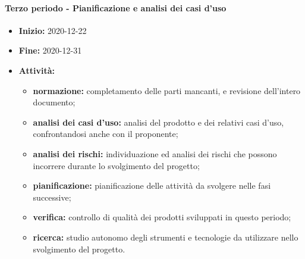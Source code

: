 \paragraph[Terzo periodo]{Terzo periodo - \textnormal{Pianificazione e analisi dei casi d'uso}}
\begin{itemize}
    \item [] \textbf{Inizio:} 2020-12-22
    \item [] \textbf{Fine:} 2020-12-31
    \item [] \textbf{Attività:}
          \begin{itemize}
              \item \textbf{normazione:} completamento delle parti mancanti, e revisione dell'intero documento;
              \item \textbf{analisi dei casi d'uso:} analisi del prodotto e dei relativi casi d'uso, confrontandosi anche con il proponente;
              \item \textbf{analisi dei rischi:} individuazione ed analisi dei rischi che possono incorrere durante lo svolgimento del progetto;
              \item \textbf{pianificazione:} pianificazione delle attività da svolgere nelle fasi successive;
              \item \textbf{verifica:} controllo di qualità dei prodotti sviluppati in questo periodo;
              \item \textbf{ricerca:} studio autonomo degli strumenti e tecnologie da utilizzare nello svolgimento del progetto.
          \end{itemize}
\end{itemize}

